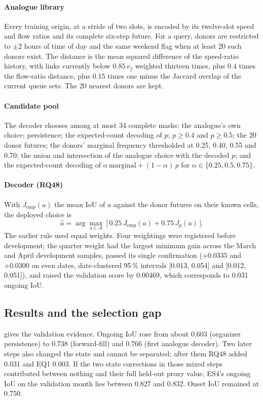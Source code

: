 \paragraph{Analogue library} Every training origin, at a stride of two slots, is encoded by its twelve-slot speed and
flow ratios and its complete six-step future. For a query, donors are restricted to $\pm2$ hours of time of day and the
same weekend flag when at least 20 such donors exist. The distance is the mean squared difference of the speed-ratio
history, with links currently below $0.85\,v_f$ weighted thirteen times, plus 0.4 times the flow-ratio distance, plus
0.15 times one minus the Jaccard overlap of the current queue sets. The 20 nearest donors are kept.

\paragraph{Candidate pool} The decoder chooses among at most 34 complete masks: the analogue's own choice; persistence;
the expected-count decoding of $p$; $p\ge0.4$ and $p\ge0.5$; the 20 donor futures; the donors' marginal frequency
thresholded at 0.25, 0.40, 0.55 and 0.70; the union and intersection of the analogue choice with the decoded $p$; and
the expected-count decoding of $\alpha\,\text{marginal}+(1-\alpha)\,p$ for $\alpha\in\{0.25,0.5,0.75\}$.

\paragraph{Decoder (RQ48)} With $J_{\mathrm{emp}}(a)$ the mean IoU of $a$ against the donor futures on their
known cells, the deployed choice is
\begin{equation}
  \hat a = \arg\max_{a\in\mathcal A}\ \Big[\,0.25\,J_{\mathrm{emp}}(a) + 0.75\,J_p(a)\,\Big].
  \label{eq:rq48}
\end{equation}
The earlier rule used equal weights. Four weightings were registered before development; the quarter weight had
the largest minimum gain across the March and April development samples, passed its single confirmation
(+0.0335 and +0.0300 on even dates, date-clustered 95\,\% intervals [0.013, 0.054] and [0.012, 0.051]), and raised
the validation score by 0.00469, which corresponds to 0.031 ongoing IoU.

\subsection{Results and the selection gap}\label{sec:queue-results}
 gives the validation evidence. Ongoing IoU rose from about 0.603 (organizer persistence) to
0.738 (forward-fill) and 0.766 (first analogue decoder). Two later steps also changed the state and cannot be
separated; after them RQ48 added 0.031 and EQ1 0.003. If the two state corrections in those mixed steps contributed
between nothing and their full held-out proxy value, ES4's ongoing IoU on the validation month lies between 0.827 and
0.832. Onset IoU remained at 0.750.

